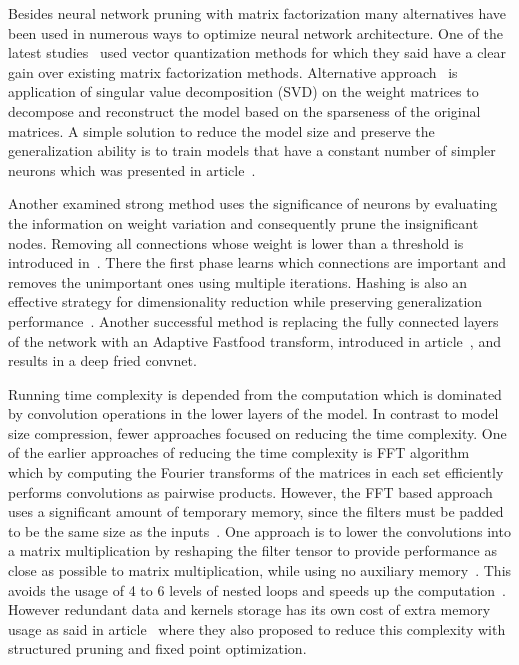 \documentclass{article} %
\begin{document}
Besides neural network pruning with matrix factorization many alternatives have
been used in numerous ways to optimize neural network architecture. One of the
latest studies~\cite{DBLP:journals/corr/GongLYB14} used vector quantization
methods for which they said have a clear gain over existing matrix
factorization methods. Alternative approach~\cite{xue2013restructuring} is
application of singular value decomposition (SVD) on the weight matrices to
decompose and reconstruct the model based on the sparseness of the
original matrices. A simple solution to
reduce the model size and preserve the generalization ability is to train
models that have a constant number of simpler neurons which was presented in
article~\cite{collins2014memory}.

Another examined strong method uses the significance of neurons by evaluating
the information on weight variation and consequently prune the insignificant
nodes. Removing all connections whose weight is lower than a threshold is
introduced in~\cite{han2015learning}. There the first phase learns which 
connections are important and removes the unimportant ones using multiple 
iterations. Hashing is also an effective strategy for dimensionality reduction
while preserving generalization performance~\cite{weinberger2009feature,
shi2009hash, chen2015compressing}. Another successful method is replacing the 
fully
connected layers of the network with an Adaptive Fastfood transform, introduced
in article~\cite{yang2014deep}, and results in a deep fried convnet. 

Running time complexity is depended from the computation which is dominated by 
convolution operations in the lower layers of the model. In contrast to model 
size compression, fewer approaches focused on reducing the time complexity. One 
of the earlier approaches of reducing the 
time complexity is FFT algorithm~\cite{mathieu2013fast} which by computing the 
Fourier transforms of the matrices in each set efficiently performs 
convolutions as pairwise products. However, the FFT based approach uses a 
significant
amount of temporary memory, since the filters must be padded to be the same size 
as the 
inputs~\cite{chetlur2014cudnn}. One approach is to lower the convolutions into a 
matrix multiplication 
by reshaping the filter tensor to provide performance as close as possible to 
matrix 
multiplication, while using no auxiliary memory~\cite{chetlur2014cudnn}. This 
avoids the usage 
of 4 to 6 levels of nested loops and speeds up the 
computation~\cite{chellapilla2006high}. 
However redundant data and kernels storage has its own cost 
of extra memory usage as said in article~\cite{anwar2015structured} where they 
also proposed to 
reduce this complexity with structured pruning and fixed point optimization. 
\end{document}

